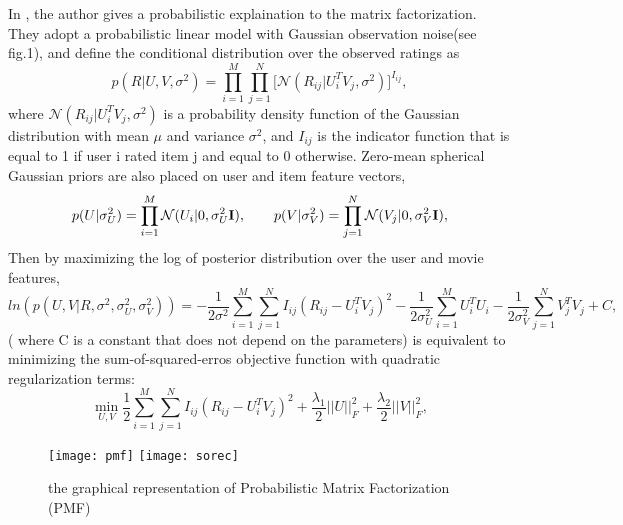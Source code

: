 In \cite{mnih2007probabilistic}, the author gives a probabilistic explaination to the matrix factorization. They adopt a probabilistic linear model with Gaussian observation noise(see fig.1), and define the conditional distribution over the observed ratings as
\begin{equation}
p(R|U,V,\sigma^2) = \prod_{i=1}^{M}\prod_{j=1}^{N}\big[\mathcal{N}(R_{ij}|U_i^TV_j,\sigma^2)\big]^{I_{ij}},
\end{equation} 
where $\mathcal{N}(R_{ij}|U_i^TV_j,\sigma^2)$ is a probability density function of the Gaussian distribution with mean $\mu$ and variance $\sigma^2$, and $I_{ij}$ is the indicator function that is equal to 1 if user i rated item j and equal to 0 otherwise. Zero-mean spherical Gaussian priors are also placed on user and item feature vectors, 
\begin{equation}
p(U|\sigma_U^2) = \prod_{i=1}^{M}\mathcal{N}(U_{i}|0,\sigma_U^2\bold{I}),\quad\quad
p(V|\sigma_V^2) = \prod_{j=1}^{N}\mathcal{N}(V_{j}|0,\sigma_V^2\bold{I}),
\end{equation} 
Then by maximizing the log of posterior distribution over the user and movie features,
\begin{equation}
ln(p(U,V|R, \sigma^2,\sigma_U^2,\sigma_V^2)) = -\frac{1}{2\sigma^2}\sum_{i=1}^{M}\sum_{j=1}^{N}I_{ij}(R_{ij} - U_i^TV_j)^2 - \frac{1}{2\sigma_U^2}\sum_{i=1}^{M}U_i^TU_i - \frac{1}{2\sigma_V^2}\sum_{j=1}^{N}V_j^TV_j + C,
\end{equation} 
( where C is a constant that does not depend on the parameters) is equivalent to minimizing the sum-of-squared-erros objective function with quadratic regularization terms:
\begin{equation}
\min_{U,V}\frac{1}{2}\sum_{i=1}^{M}\sum_{j=1}^{N}I_{ij}(R_{ij} - U_i^TV_j)^2 + \frac{\lambda_1}{2}||U||_F^2 + \frac{\lambda_2}{2}||V||_F^2,
\end{equation} 
\begin{figure}[h]
	\caption{the graphical representation of Probabilistic Matrix Factorization (PMF)}
	\centering
	\texttt{[image: pmf]}
	\texttt{[image: sorec]}
\end{figure}

